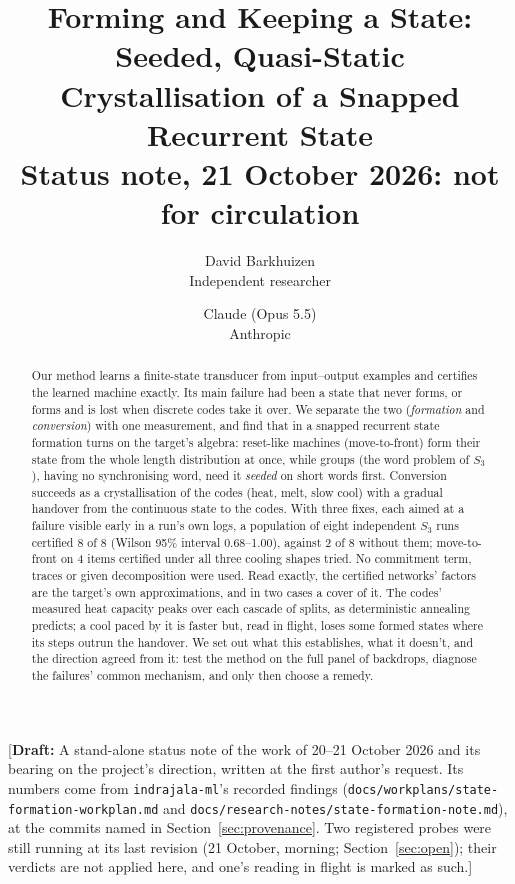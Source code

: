 \documentclass[11pt]{article}
\title{Forming and Keeping a State:\\Seeded, Quasi-Static Crystallisation of a Snapped Recurrent State\\[0.5em]
\large Status note, 21 October 2026: not for circulation}
\author{
  David Barkhuizen\\
  Independent researcher
  \and
  Claude (Opus 5.5)\\
  Anthropic
}
\date{}
\newcommand{\draftnote}[1]{\textcolor{red!70!black}{[\textbf{Draft:} #1]}}
\begin{document}
\maketitle

\draftnote{A stand-alone status note of the work of 20--21 October 2026 and its bearing on the
project's direction, written at the first author's request. Its numbers come from
\texttt{indrajala-ml}'s recorded findings (\texttt{docs/workplans/state-formation-workplan.md} and
\texttt{docs/research-notes/state-formation-note.md}), at the commits named in Section~\ref{sec:provenance}. Two
registered probes were still running at its last revision (21 October, morning;
Section~\ref{sec:open}); their verdicts are not applied here, and one's reading in flight is marked
as such.}

\begin{abstract}
Our method learns a finite-state transducer from input--output examples and certifies the learned
machine exactly. Its main failure had been a state that never forms, or forms and is lost when
discrete codes take it over. We separate the two (\emph{formation} and \emph{conversion}) with one
measurement, and find that in a snapped recurrent state formation turns on the target's algebra: reset-like machines
(move-to-front) form their state from the whole length distribution at once, while groups (the word
problem of $S_3$), having no synchronising word, need it \emph{seeded} on short words first.
Conversion succeeds as a crystallisation of the codes (heat, melt, slow cool) with a gradual
handover from the continuous state to the codes. With three fixes, each aimed at a failure visible
early in a run's own logs, a population of eight independent $S_3$ runs certified 8 of 8 (Wilson
95\% interval 0.68--1.00), against 2 of 8 without them; move-to-front on 4 items certified under
all three cooling shapes tried. No commitment term, traces or given decomposition were used.
Read exactly, the certified networks' factors are the target's own approximations, and in two
cases a cover of it. The codes' measured heat capacity peaks over each cascade of splits, as
deterministic annealing predicts; a cool paced by it is faster but, read in flight, loses some
formed states where its steps outrun the handover. We set out what this establishes, what it doesn't, and the direction agreed
from it: test the method on the full panel of backdrops, diagnose the failures' common mechanism,
and only then choose a remedy.
\end{abstract}
\end{document}

